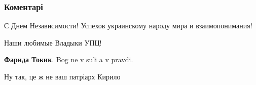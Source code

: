  
 
 
 
 
\subsubsection{Коментарі}

\begin{itemize}
 
С Днем Независимости! Успехов украинскому народу мира и взаимопонимания!

 
Наши любимые Владыки УПЦ!

\begin{itemize}
 
\textbf{Фарида Токик}. Bog ne v suli a v pravdi.
\end{itemize}

 
Ну так, це ж не ваш патріарх Кирило

\begin{itemize}
 

\end{itemize}
\end{itemize}

